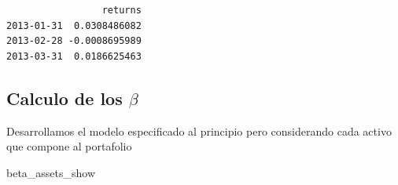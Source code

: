 \documentclass[
  letterpaper,
  DIV=11,
  numbers=noendperiod]{scrartcl}
\newenvironment{Shaded}{\begin{snugshade}}{\end{snugshade}}
\newcommand{\AttributeTok}[1]{\textcolor[rgb]{0.40,0.45,0.13}{#1}}
\newcommand{\DecValTok}[1]{\textcolor[rgb]{0.68,0.00,0.00}{#1}}
\newcommand{\FunctionTok}[1]{\textcolor[rgb]{0.28,0.35,0.67}{#1}}
\newcommand{\NormalTok}[1]{\textcolor[rgb]{0.00,0.23,0.31}{#1}}
\newcommand{\OtherTok}[1]{\textcolor[rgb]{0.00,0.23,0.31}{#1}}
\newcommand{\SpecialCharTok}[1]{\textcolor[rgb]{0.37,0.37,0.37}{#1}}
\begin{document}
\begin{verbatim}
                 returns
2013-01-31  0.0308486082
2013-02-28 -0.0008695989
2013-03-31  0.0186625463
\end{verbatim}

\subsection{\texorpdfstring{Calculo de los
\(\beta\)}{Calculo de los \textbackslash beta}}\label{calculo-de-los-beta}

Desarrollamos el modelo especificado al principio pero considerando cada
activo que compone al portafolio

\begin{Shaded}
\end{Shaded}

\begin{Shaded}
\begin{Highlighting}[]
\NormalTok{beta\_assets\_show}
\end{Highlighting}
\end{Shaded}
\end{document}
